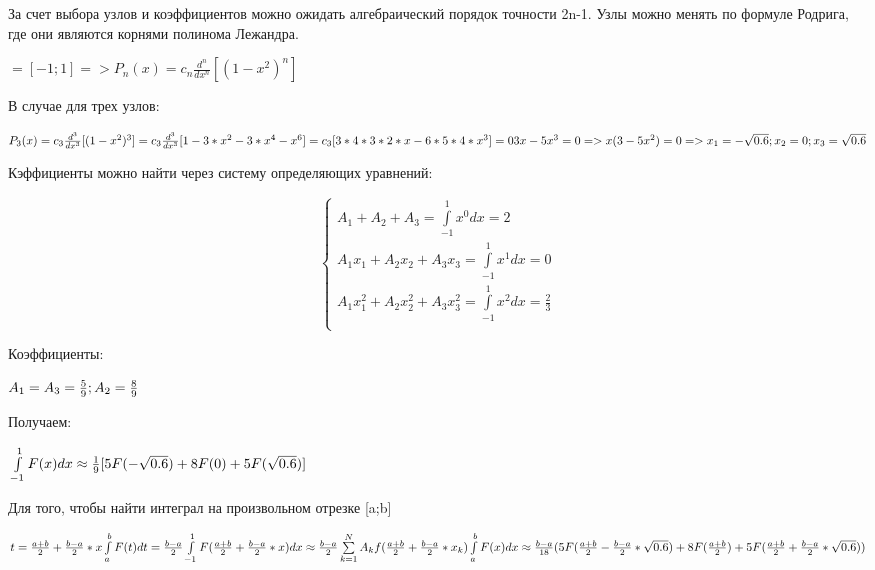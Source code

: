 За счет выбора узлов и коэффициентов можно ожидать алгебраический порядок точности 2n-1. Узлы можно менять по формуле Родрига, где они являются корнями полинома Лежандра.

\begin{math} 
	[a;b]=[-1;1] => P_{n}(x)=c_{n}\frac{d^{n}}{dx^{n}}[(1-x^{2})^{n}] 
\end{math}

В случае для трех узлов: 

\begin{math} 
	\\
    P_{3}(x)=c_{3}\frac{d^{3}}{dx^{3}}[(1-x^{2})^{3}] = c_{3}\frac{d^{3}}{dx^{3}}[1-3*x^{2}-3*x^{4}-x^{6}]= c_{3}[3*4*3*2*x-6*5*4*x^{3}]=0 \\
    3x-5x^{3}=0 => x(3-5x^{2})=0 => x_{1}=-\sqrt{0.6}; x_{2}=0; x_{3}=\sqrt{0.6}
\end{math}

Кэффициенты можно найти через систему определяющих уравнений: 

\begin{equation}
	\begin{cases}
		A_{1}+A_{2}+A_{3}= \int\limits_{-1}^{1} x^{0}dx=2 \\
		A_{1}x_{1}+A_{2}x_{2}+A_{3}x_{3}=\int\limits_{-1}^{1} x^{1}dx=0 \\
		A_{1}x_{1}^{2}+A_{2}x_{2}^{2}+A_{3}x_{3}^{2}=\int\limits_{-1}^{1} x^{2}dx=\frac{2}{3} \\
	\end{cases}
\end{equation}

Коэффициенты: 

\begin{math} 
	\\ 
	A_{1}=A_{3}=\frac{5}{9}; A_{2}=\frac{8}{9}
\end{math}

Получаем: 

\begin{math} 
	\\ 
	\int\limits_{-1}^{1}F(x)dx \approx \frac{1}{9}[5F(-\sqrt{0.6})+8F(0)+5F(\sqrt{0.6})]
\end{math}

Для того, чтобы найти интеграл на произвольном отрезке [a;b]

\begin{math} 
	\\ 
	t = \frac{a+b}{2}+\frac{b-a}{2}*x \\
	\int\limits_{a}^{b}F(t)dt = \frac{b-a}{2} \int\limits_{-1}^{1}F(\frac{a+b}{2}+\frac{b-a}{2}*x)dx \approx \frac{b-a}{2} \sum\limits_{k=1}^{N}A_{k}f(\frac{a+b}{2}+\frac{b-a}{2}*x_{k}) \\
	\int\limits_{a}^{b} F(x)dx \approx \frac{b-a}{18} (5F(\frac{a+b}{2}-\frac{b-a}{2}*\sqrt{0.6})+8F(\frac{a+b}{2}) +5F(\frac{a+b}{2}+\frac{b-a}{2}*\sqrt{0.6}))
\end{math}

